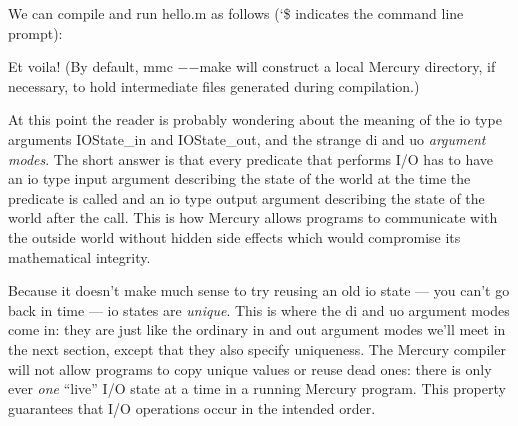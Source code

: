 \documentclass[a4paper,11pt,notitlepage,onecolumn]{book}
\begin{document}
We can compile and run \textsf{hello.m} as follows (\textsf{\char`\${}} indicates the command line
prompt):
\begin{small}

\begin{ptabular}
\nextline
{}
\nextline
{}
\nextline
{}
\nextline
{}
\nextline
{}
\nextline
{}
\nextline
\end{ptabular}

\end{small}
Et voila!  (By default, \textsf{mmc {\ensuremath{-}}{\ensuremath{-}}make} will construct a local \textsf{Mercury}
directory, if necessary, to hold intermediate files generated during
compilation.)

At this point the reader is probably wondering about the meaning of the \textsf{io}
type arguments \textsf{IOState\_in} and \textsf{IOState\_out}, and the strange \textsf{di} and \textsf{uo}
\emph{argument modes}.  The short answer is that every predicate that
performs I/O has to have an \textsf{io} type input argument describing
the state of the world at the time the predicate is called and an \textsf{io} type
output argument describing the state of the world after the call.  This is
how Mercury allows programs to communicate with the outside world without
hidden side effects which would compromise its mathematical integrity.

Because it doesn't make much sense to try reusing an old \textsf{io} state --- you
can't go back in time
--- \textsf{io} states are \emph{unique}.
This is where the \textsf{di} and \textsf{uo} argument modes come in: they are just like
the ordinary \textsf{in} and \textsf{out} argument modes we'll meet in the next section,
except that they also specify uniqueness.  The Mercury compiler will not
allow programs to copy unique values or reuse dead ones:
there is only ever \emph{one} ``live'' I/O state at a time in a running
Mercury program.  This property guarantees that I/O operations occur
in the intended order.
\end{document}
